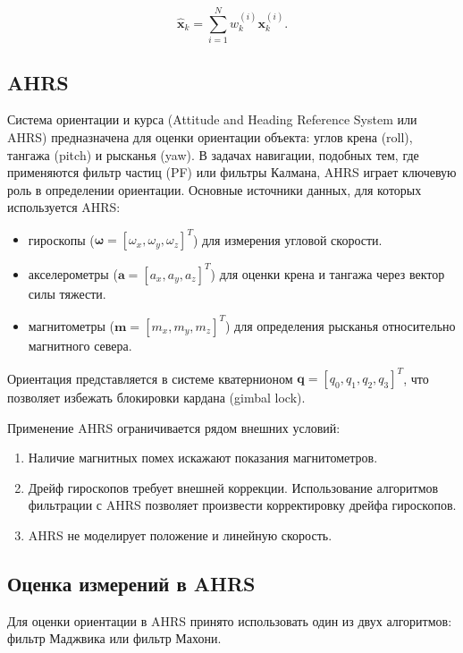 \begin{equation}
    \hat{\mathbf{x}}_k = \sum_{i=1}^N w_k^{(i)} \mathbf{x}_k^{(i)}.
\end{equation}

\subsection{AHRS}
\label{subsec:ahrs}

Система ориентации и курса (Attitude and Heading Reference System или AHRS) предназначена для оценки
ориентации объекта: углов крена (roll), тангажа (pitch) и рысканья (yaw).
В задачах навигации, подобных тем, где применяются фильтр частиц (PF) или фильтры Калмана,
AHRS играет ключевую роль в определении ориентации.
Основные источники данных, для которых используется AHRS: 
\begin{itemize}
    \item гироскопы (\(\boldsymbol{\omega} = [\omega_x, \omega_y, \omega_z]^T\)) для измерения угловой скорости.
    \item акселерометры (\(\mathbf{a} = [a_x, a_y, a_z]^T\)) для оценки крена и тангажа через вектор силы тяжести.
    \item магнитометры (\(\mathbf{m} = [m_x, m_y, m_z]^T\)) для определения рысканья относительно магнитного севера.
\end{itemize}

Ориентация представляется в системе кватернионом \(\mathbf{q} = [q_0, q_1, q_2, q_3]^T\), что позволяет
избежать блокировки кардана (gimbal lock).

Применение AHRS ограничивается рядом внешних условий:

\begin{enumerate}[label=\arabic*]
    \item Наличие магнитных помех искажают показания магнитометров.
    \item Дрейф гироскопов требует внешней коррекции. Использование алгоритмов фильтрации
	    с AHRS позволяет произвести корректировку дрейфа гироскопов.
    \item AHRS не моделирует положение и линейную скорость.
\end{enumerate}

\subsection{Оценка измерений в AHRS}

Для оценки ориентации в AHRS принято использовать один из двух алгоритмов: фильтр Маджвика или фильтр Махони.

